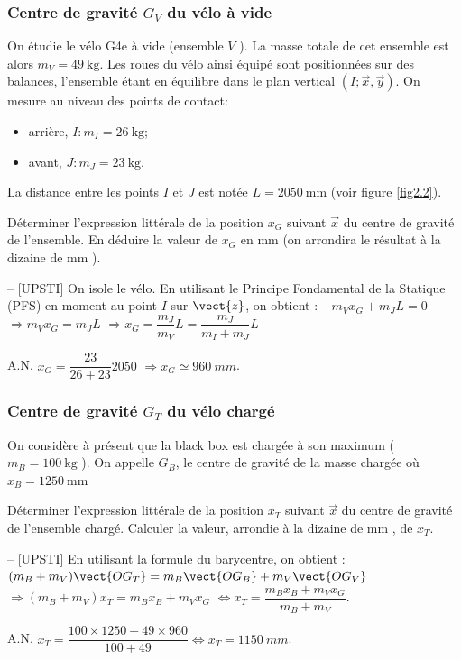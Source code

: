 \subsubsection{Centre de gravité \(G_{V}\) du vélo à vide}
On étudie le vélo G4e à vide (ensemble \(V\) ). La masse totale de cet ensemble est alors \(m_{V}=49 \mathrm{~kg}\). Les roues du vélo ainsi équipé sont positionnées sur des balances, l'ensemble étant en équilibre dans le plan vertical \((I ; \vec{x}, \vec{y})\). On mesure au niveau des points de contact:
\begin{itemize}
\item arrière, \(I: m_{I}=26 \mathrm{~kg}\);
  \item avant, \(J: m_{J}=23 \mathrm{~kg}\).
\end{itemize}
La distance entre les points \(I\) et \(J\) est notée \(L=2050 \mathrm{~mm}\) (voir figure \ref{fig2.2}).\\
\fi

\begin{question}Déterminer l'expression littérale de la position \(x_{G}\) suivant \(\vec{x}\) du centre de gravité de l'ensemble. En déduire la valeur de \(x_{G}\) en mm (on arrondira le résultat à la dizaine de mm ).
\end{question}
\ifprof
\begin{corrige}-- [UPSTI]
On isole le vélo. En utilisant le Principe Fondamental de la Statique (PFS) en moment au point $I$ sur $\vect{z}$, on obtient :
$-m_V x_G+m_J L=0$ 
$\Rightarrow m_V x_G = m_J L$
$\Rightarrow x_G=\dfrac{m_J}{m_V}  L=\dfrac{m_J}{m_I+m_J}  L$

A.N. $x_G=\dfrac{23}{26+23}2050$ $\Rightarrow  x_G \simeq \SI{960}{mm}$.

\end{corrige}
\else
\fi

\subsubsection{Centre de gravité \(G_{T}\) du vélo chargé}
\ifprof
\else
On considère à présent que la black box est chargée à son maximum ( \(m_{B}=100 \mathrm{~kg}\) ). On appelle \(G_{B}\), le centre de gravité de la masse chargée où \(x_{B}=1250 \mathrm{~mm}\)
\fi

\begin{question}Déterminer l'expression littérale de la position \(x_{T}\) suivant \(\vec{x}\) du centre de gravité de l'ensemble chargé. Calculer la valeur, arrondie à la dizaine de mm , de \(x_{T}\).
\end{question}
\ifprof
\begin{corrige}-- [UPSTI]
En utilisant la formule du barycentre, on obtient :
$(m_B+m_V ) \vect{OG_T}  =m_B \vect{OG_B}+m_V \vect{OG_V}$ $\Rightarrow  (m_B+m_V ) x_T=m_B x_B+m_V x_G$ $\Leftrightarrow  x_T=\dfrac{m_B x_B+m_V x_G}{m_B+m_V}$.

A.N. $x_T=\dfrac{100\times 1250+49\times 960}{100+49} \Leftrightarrow x_T=\SI{1150}{mm}$.

\end{corrige}
\else
\fi

